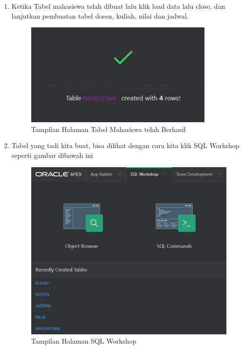 \begin{enumerate}
\item Ketika Tabel mahasiswa telah dibuat lalu klik load data lalu close, dan lanjutkan pembuatan tabel dosen, kuliah, nilai dan jadwal.
    \begin{figure}[!htbp]
    \begin{center}
    \includegraphics[scale=0.9]{section/ica56.JPG}
    \caption{Tampilan Halaman Tabel Mahasiswa telah Berhasil}
    \end{center}   
    \end{figure} \vspace{6cm}
    
\item Tabel yang tadi kita buat, bisa dilihat dengan cara kita klik SQL Workshop seperti gambar dibawah ini
    \begin{figure}[!htbp]
    \begin{center}
    \includegraphics[scale=0.9]{section/ica57.JPG}
    \caption{Tampilan Halaman SQL Workshop}
    \end{center}   
    \end{figure} 
    

\end{enumerate}
